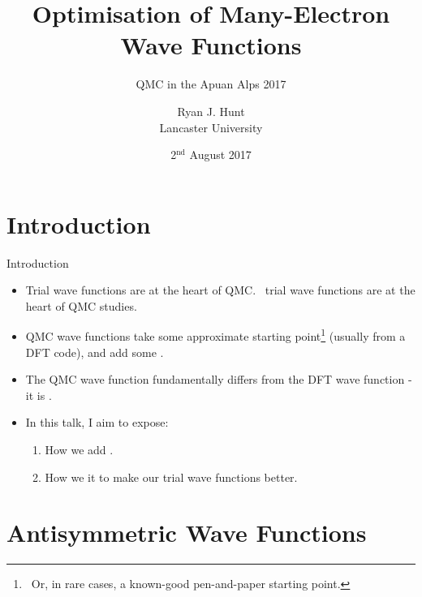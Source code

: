 \documentclass[12pt, pdf, hyperref={draft}, usenames, dvipsnames,
aspectratio=169]{beamer}
\title{Optimisation of Many-Electron Wave Functions}
\subtitle{QMC in the Apuan Alps 2017}
\author{Ryan J. Hunt\\
        Lancaster University}
\date{2$^{\text{nd}}$ August 2017}
\newcommand{\blue}[1]{{\bf\color{NavyBlue}{#1}}}
\newcommand{\green}[1]{{\bf\color{ForestGreen}{#1}}}
\begin{document}
\begin{frame}[plain]
  \titlepage\end{frame}





\setlength\abovedisplayskip{3pt}
\setlength\belowdisplayskip{3pt}


\section{Introduction}\label{sec:introduction}

\begin{frame}{Introduction}
\begin{itemize}
  \item Trial wave functions are at the heart of QMC.\ \green{Good} trial wave
  functions are at the heart of \green{good} QMC studies.
  \item QMC wave functions take some approximate starting point\footnote{\ Or,
  in rare cases, a known-good pen-and-paper starting point.} (usually from a
  DFT code), and add some \blue{exploitable variational freedom}.
  \item The QMC wave function fundamentally differs from the DFT wave function
  - it is \blue{explicitly correlated}.
  \item In this talk, I aim to expose:
  \begin{enumerate}
    \item How we add \blue{variational freedom}.
    \item How we \green{exploit} it to make our trial wave functions better.
  \end{enumerate}
\end{itemize}
\end{frame}


\section{Antisymmetric Wave Functions}\label{sec:antisymm_wfns}
\end{document}
